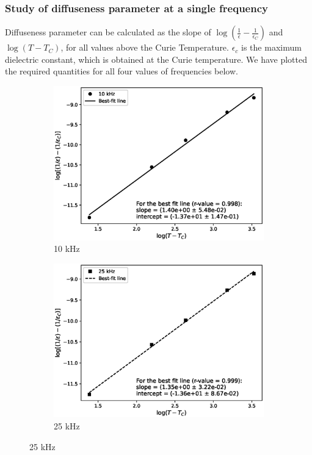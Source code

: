 	\subsubsection*{Study of diffuseness parameter at a single frequency}
	\vspace{-1em}

	Diffuseness parameter can be calculated as the slope of $\log(\frac{1}{\epsilon}-\frac{1}{\epsilon_C})$ and $\log(T-T_C)$, for all values above the Curie Temperature. $\epsilon_c$ is the maximum dielectric constant, which is obtained at the Curie temperature. 
	We have plotted the required quantities for all four values of frequencies below.

	\vspace{-5em}

	\begin{figure}[H]
		\begin{subfigure}{\linewidth}
		\includegraphics[width=1\textwidth]{images/TC10.eps}
		\caption{10 kHz}
		\end{subfigure}
		
		\begin{subfigure}{\linewidth}
		\includegraphics[width=1\textwidth]{images/TC25.eps}
		\caption{25 kHz}
		\end{subfigure}
		

\end{figure}
